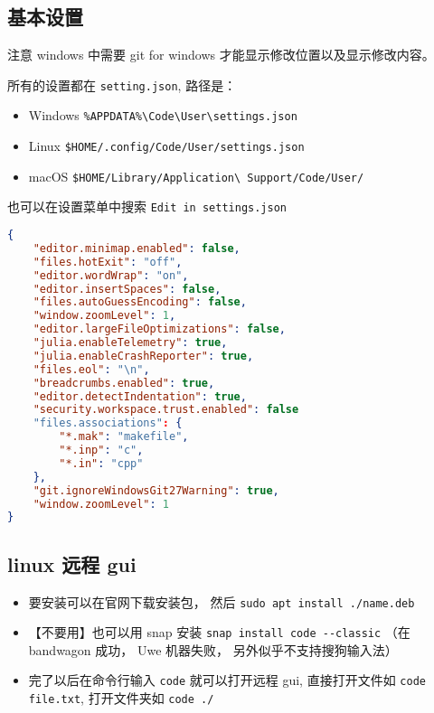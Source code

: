 
\subsection{基本设置}

注意 windows 中需要 git for windows 才能显示修改位置以及显示修改内容。

所有的设置都在 \verb`setting.json`, 路径是：
\begin{itemize}
\item Windows \verb`%APPDATA%\Code\User\settings.json`
\item Linux \verb`$HOME/.config/Code/User/settings.json`
\item macOS \verb`$HOME/Library/Application\ Support/Code/User/`
\end{itemize}

也可以在设置菜单中搜索 \verb`Edit in settings.json`

\begin{lstlisting}[language=json,caption=settings.json]
{
	"editor.minimap.enabled": false,
	"files.hotExit": "off",
	"editor.wordWrap": "on",
    "editor.insertSpaces": false,
	"files.autoGuessEncoding": false,
	"window.zoomLevel": 1,
	"editor.largeFileOptimizations": false,
	"julia.enableTelemetry": true,
	"julia.enableCrashReporter": true,
	"files.eol": "\n",
	"breadcrumbs.enabled": true,
	"editor.detectIndentation": true,
	"security.workspace.trust.enabled": false
	"files.associations": {
		"*.mak": "makefile",
		"*.inp": "c",
		"*.in": "cpp"
	},
	"git.ignoreWindowsGit27Warning": true,
	"window.zoomLevel": 1
}
\end{lstlisting}


\subsection{linux 远程 gui}
\begin{itemize}
\item 要安装可以在官网下载安装包， 然后 \verb`sudo apt install ./name.deb`
\item 【不要用】也可以用 snap 安装 \verb`snap install code --classic` （在 bandwagon 成功， Uwe 机器失败， 另外似乎不支持搜狗输入法）
\item 完了以后在命令行输入 \verb`code` 就可以打开远程 gui, 直接打开文件如 \verb`code file.txt`, 打开文件夹如 \verb`code ./`
\end{itemize}
